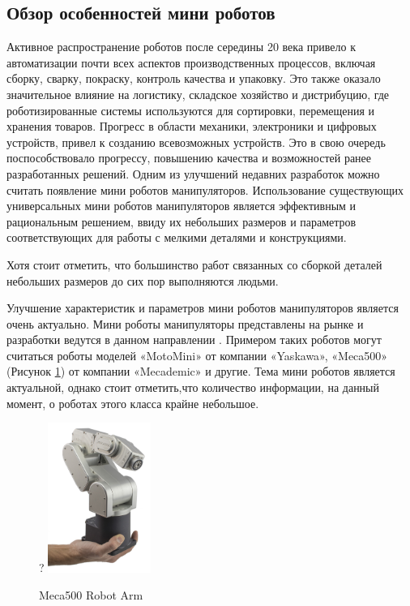 \subsection{Обзор особенностей мини роботов}

Активное распространение роботов после середины 20 века привело к автоматизации почти всех аспектов производственных процессов, включая сборку, сварку, покраску, контроль качества и упаковку. Это также оказало значительное влияние на логистику, складское хозяйство
и дистрибуцию, где роботизированные системы используются для сортировки, перемещения и
хранения товаров. Прогресс в области механики, электроники и цифровых устройств, привел к
созданию всевозможных устройств. Это в свою очередь поспособствовало прогрессу, повышению качества и возможностей ранее разработанных решений. Одним из улучшений недавних разработок можно считать появление мини роботов манипуляторов.
Использование существующих универсальных мини роботов манипуляторов является эффективным и рациональным решением, ввиду их небольших размеров и параметров соответствующих для работы с мелкими деталями и конструкциями. 

Хотя стоит отметить, что большинство работ связанных со сборкой деталей небольших размеров до сих пор выполняются людьми.

Улучшение характеристик и параметров мини роботов манипуляторов является очень актуально.
Мини роботы манипуляторы представлены на рынке и разработки ведутся в данном направлении \citep{Li2022}. Примером таких роботов могут считаться роботы моделей «MotoMini» от компании «Yaskawa», «Meca500» (Рисунок \ref{meca}) от компании «Mecademic»  и другие. Тема мини роботов является актуальной, однако стоит отметить,что количество информации, на данный момент, о роботах этого класса крайне небольшое.

\begin{figure}[H]
	\centering?
	\includegraphics[width=0.3\textwidth]{Src/images/Meca500.jpg}
	\caption{Meca500 Robot Arm}
	\label{meca}
\end{figure}


